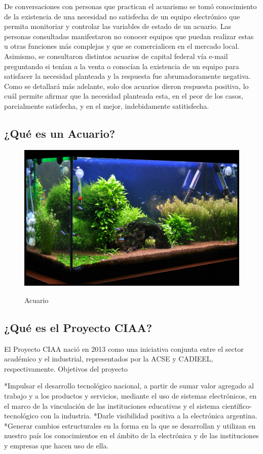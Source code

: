 De conversaciones con personas que practican el acuarismo se tomó conocimiento de la existencia de una necesidad no satisfecha de un equipo electrónico que permita monitoriar y controlar las variables de estado de un acuario.  %
Las personas consultadas manifestaron no conocer equipos que puedan realizar estas u otras funciones más complejas y que se comercialicen en el mercado local.  
Asimismo, se consultaron distintos acuarios de capital federal vía e-mail preguntando si tenían a la venta o conocían la existencia de un equipo para satisfacer la necesidad planteada y la respuesta fue abrumadoramente negativa. Como se detallará más adelante, solo dos acuarios dieron respuesta positiva, lo cuál permite afirmar que la necesidad planteada esta, en el peor de los casos, parcialmente satisfecha, y en el mejor, indebidamente satitisfecha.


\subsection{¿Qué es un Acuario?}

	\begin{figure}[]
		\centering
	    \includegraphics[width=.5\textwidth]{./Figures/acuarioHobby3.jpg}
		\label{fig.acuarioHobby}
		\caption{Acuario}
	\end{figure}       

\subsection{¿Qué es el Proyecto CIAA?}

El Proyecto CIAA nació en 2013 como una iniciativa conjunta entre el sector académico y el industrial, representados por la ACSE y CADIEEL, respectivamente.
Objetivos del proyecto

*Impulsar el desarrollo tecnológico nacional, a partir de sumar valor agregado al trabajo y a los productos y servicios, mediante el uso de sistemas electrónicos, en el marco de la vinculación de las instituciones educativas y el sistema científico-tecnológico con la industria.
*Darle visibilidad positiva a la electrónica argentina.
*Generar cambios estructurales en la forma en la que se desarrollan y utilizan en nuestro país los conocimientos en el ámbito de la electrónica y de las instituciones y empresas que hacen uso de ella.


